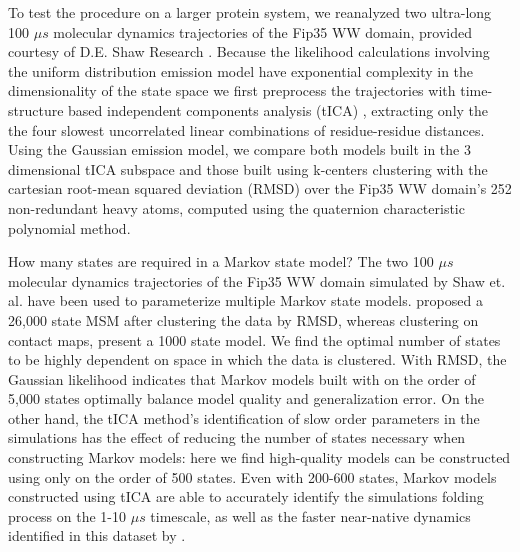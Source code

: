 \documentclass[twocolumn,floatfix,nofootinbib,aps]{revtex4-1}
\begin{document}
To test the procedure on a larger protein system, we reanalyzed two ultra-long 100 $\mu s$ molecular dynamics trajectories of the Fip35 WW domain\cite{Liu2008Experimental}, provided courtesy of D.E. Shaw Research \cite{Shaw2010Atomic}. Because the likelihood calculations involving the uniform distribution emission model have exponential complexity in the dimensionality of the state space we first preprocess the trajectories with time-structure based independent components analysis (tICA) \cite{Schwantes2013Improvements, Perez2013Identification}, extracting only the the four slowest uncorrelated linear combinations of residue-residue distances. Using the Gaussian emission model, we compare both models built in the 3 dimensional tICA subspace and those built using k-centers clustering with the cartesian root-mean squared deviation (RMSD) over the Fip35 WW domain's 252 non-redundant heavy atoms, computed using the quaternion characteristic polynomial method\cite{Theobald2005Rapid}.

How many states are required in a Markov state model? The two 100 $\mu s$ molecular dynamics trajectories of the Fip35 WW domain simulated by Shaw et. al.\cite{Shaw2010Atomic} have been used to parameterize multiple Markov state models. \citet{Lane2011Markov} proposed a 26,000 state MSM after clustering the data by RMSD, whereas \citet{Kellogg2012Evaluation} clustering on contact maps, present a 1000 state model. We find the optimal number of states to be highly dependent on space in which the data is clustered. With RMSD, the Gaussian likelihood indicates that Markov models built with on the order of 5,000 states optimally balance model quality and generalization error. On the other hand, the tICA method's identification of slow order parameters in the simulations has the effect of reducing the number of states necessary when constructing Markov models: here we find high-quality models can be constructed using only on the order of 500 states. Even with 200-600 states, Markov models constructed using tICA are able to accurately identify the simulations folding process on the 1-10 $\mu s$ timescale, as well as the faster near-native dynamics identified in this dataset by \citet{McGibbon2013Learning}.
\end{document}
